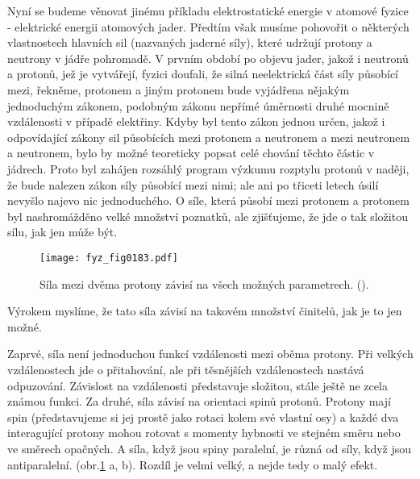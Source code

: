     Nyní se budeme věnovat jinému příkladu elektrostatické energie v atomové fyzice - elektrické
    energii atomových jader. Předtím však musíme pohovořit o některých vlastnostech hlavních sil
    (nazvaných jaderné síly), které udržují protony a neutrony v jádře pohromadě. V prvním období po
    objevu jader, jakož i neutronů a protonů, jež je vytvářejí, fyzici doufali, že silná
    neelektrická část síly působící mezi, řekněme, protonem a jiným protonem bude vyjádřena nějakým
    jednoduchým zákonem, podobným zákonu nepřímé úměrnosti druhé mocnině vzdálenosti v případě
    elektřiny. Kdyby byl tento zákon jednou určen, jakož i odpovídající zákony sil působících mezi
    protonem a neutronem a mezi neutronem a neutronem, bylo by možné teoreticky popsat celé chování
    těchto částic v jádrech. Proto byl zahájen rozsáhlý program výzkumu rozptylu protonů v naději,
    že bude nalezen zákon síly působící mezi nimi; ale ani po třiceti letech úsilí nevyšlo najevo
    nic jednoduchého. O síle, která působí mezi protonem a protonem byl nashromážděno velké množství
    poznatků, ale zjišťujeme, že jde o tak složitou sílu, jak jen může být.

    \begin{figure}[ht!]  %
      \centering
      \texttt{[image: fyz\_fig0183.pdf]}
      \caption{Síla mezi dvěma protony závisí na všech možných parametrech.
              (\cite[s.~148]{Feynman02}).}
      \label{fyz:fig0183}
    \end{figure}

    Výrokem  myslíme, že tato síla závisí na takovém množství
    činitelů, jak je to jen možné.
    
    Zaprvé, síla není jednoduchou funkcí vzdálenosti mezi oběma protony. Při velkých vzdálenostech
    jde o přitahování, ale při těsnějších vzdálenostech nastává odpuzování. Závislost na vzdálenosti
    představuje složitou, stále ještě ne zcela známou funkci. Za druhé, síla závisí na orientaci
    spinů protonů. Protony mají spin (představujeme si jej prostě jako rotaci kolem své vlastní osy)
    a každé dva interagující protony mohou rotovat s momenty hybnosti ve stejném směru nebo ve
    směrech opačných. A síla, když jsou spiny paralelní, je různá od síly, když jsou antiparalelní.
    (obr.\ref{fyz:fig0183} a, b). Rozdíl je velmi velký, a nejde tedy o malý efekt.

